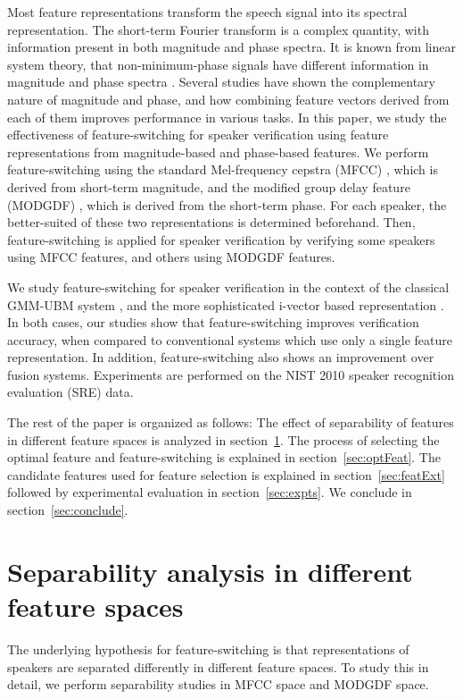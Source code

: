 \documentclass[preprint,12pt,5p]{elsarticle}
\begin{document}
Most feature representations transform the speech signal into its spectral
representation. The short-term Fourier transform is a complex quantity, with
information present in both magnitude and phase spectra. It is known from linear
system theory, that non-minimum-phase signals have different information in
magnitude and phase spectra \cite{oppenheim}. Several studies \cite{complement2}
have shown the complementary nature of magnitude and phase, and how combining feature
vectors derived from each of them improves performance in various tasks. In this
paper, we study the effectiveness of feature-switching for speaker verification
using feature representations from magnitude-based and phase-based features. We
perform feature-switching using the standard Mel-frequency cepstra (MFCC)
\cite{mfcc}, which is derived from short-term magnitude, and the modified group 
delay feature (MODGDF) \cite{hegdeModgdf}, which is derived from the short-term phase.
For each speaker, the better-suited of these two representations is determined
beforehand. Then, feature-switching is applied for speaker verification by verifying
some speakers using MFCC features, and others using MODGDF features.

We study feature-switching for speaker verification in the context of the
classical GMM-UBM system \cite{reynoldsAdaptedGMM}, and the more
sophisticated i-vector based representation \cite{dehak_ivector}. In both cases,
our studies show that feature-switching improves verification accuracy, when
compared to conventional systems which use only a single feature
representation. In addition, feature-switching also shows an improvement over
fusion systems. Experiments are performed on the NIST 2010 speaker recognition
evaluation (SRE) \cite{nist2010SRE} data.

The rest of the paper is organized as follows: The effect of separability of features 
in different feature spaces is analyzed in section~\ref{sec:separability}. The process 
of selecting the optimal feature and feature-switching is explained in 
section~\ref{sec:optFeat}. The candidate features used for 
feature selection is explained in section~\ref{sec:featExt} followed by experimental 
evaluation in section~\ref{sec:expts}. We conclude in section~\ref{sec:conclude}. 

\section{Separability analysis in different feature spaces}
\label{sec:separability}
The underlying hypothesis for feature-switching is that representations of  
speakers are separated differently in different feature spaces. To study this in detail, we
perform separability studies in MFCC space and MODGDF space.
\end{document}
